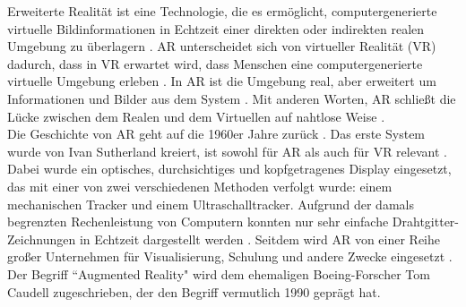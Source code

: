 \documentclass[deutsch]{llncs}
\begin{document}
Erweiterte Realität ist eine Technologie, die es ermöglicht, computergenerierte virtuelle Bildinformationen in Echtzeit einer direkten oder indirekten realen Umgebung zu überlagern \cite{Edu}. AR unterscheidet sich von virtueller Realität (VR) dadurch, dass in VR erwartet wird, dass Menschen eine computergenerierte virtuelle Umgebung erleben \cite{Edu}. In AR ist die Umgebung real, aber erweitert um Informationen und Bilder aus dem System \cite{Edu}. Mit anderen Worten, AR schließt die Lücke zwischen dem Realen und dem Virtuellen auf nahtlose Weise \cite{Edu}.\\
Die Geschichte von AR geht auf die 1960er Jahre zurück \cite{Edu}. Das erste System wurde von Ivan Sutherland kreiert, ist sowohl für AR als auch für VR relevant \cite{Edu}. Dabei wurde ein optisches, durchsichtiges und kopfgetragenes Display eingesetzt, das mit einer von zwei verschiedenen Methoden verfolgt wurde: einem mechanischen Tracker und einem Ultraschalltracker\cite{Edu}. Aufgrund der damals begrenzten Rechenleistung von Computern konnten nur sehr einfache Drahtgitter-Zeichnungen in Echtzeit dargestellt werden \cite{Edu}. Seitdem wird AR von einer Reihe großer Unternehmen für Visualisierung, Schulung und andere Zwecke eingesetzt \cite{Edu}. Der Begriff ``Augmented Reality" wird dem ehemaligen Boeing-Forscher Tom Caudell zugeschrieben, der den Begriff vermutlich 1990 geprägt hat\cite{Edu}.
\end{document}
